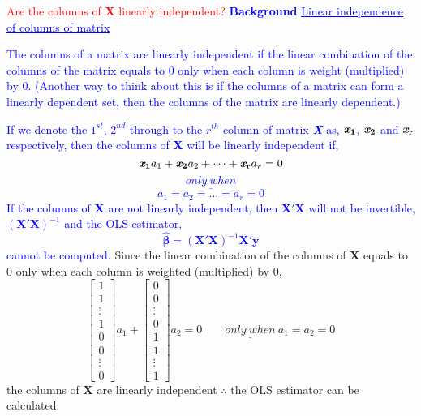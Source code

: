 \documentclass[12pt]{report}
\newenvironment{blueframed}[1][blue]
{\def\FrameCommand{\fboxsep=\FrameSep\fcolorbox{#1}{white}}%
\MakeFramed {\advance\hsize-\width \FrameRestore}}
{\endMakeFramed}
\begin{document}
\newpage
\noindent \textcolor{red}{Are the columns of \textbf{X} linearly independent?}
\justify
\begin{blueframed}
	\textcolor{blue}{\textbf{Background}}
	\vspace{-\baselineskip}
	\justify
	\textcolor{blue}{\underline{Linear independence of columns of matrix}}
	
	\noindent \textcolor{blue}
	{
		The columns of a matrix are linearly independent if the linear combination of the columns of the matrix equals to 0 only when each column is weight (multiplied) by 0. (Another way to think about this is if the columns of a matrix can form a linearly dependent set, then the columns of the matrix are linearly dependent.)
	}
	
	\noindent \textcolor{blue}
	{
		If we denote the $1^{st}$, $2^{nd}$ through to the $r^{th}$ column of matrix \textit{\textbf{X}} as, $\textit{\textbf{x}}_\textbf{1}$, $\textit{\textbf{x}}_\textbf{2}$ and $\textit{\textbf{x}}_\textbf{r}$ respectively, then the columns of \textbf{X} will be linearly independent if,
		$$ 
		\textit{\textbf{x}}_\textbf{1}a_1 + \textit{\textbf{x}}_\textbf{2}a_2 + \dots + \textit{\textbf{x}}_\textbf{r}a_r = 0
		$$
		$$
		\underline{only\ when}
		$$
		$$
		a_1 = a_2 = \dots = a_r = 0
		$$ If the columns of \textbf{X} are not linearly independent, then $\textbf{X}'\textbf{X}$ will not be invertible,
		\sout{$(\textbf{X}'\textbf{X})^{-1}$}
		and the OLS estimator,
		$$
		\widehat{\boldsymbol{\beta}} 
		= (\textbf{X}'\textbf{X})^{-1}\textbf{X}'\textbf{y}
		$$
		cannot be computed.
	}
\end{blueframed}
\noindent Since the linear combination of the columns of \textbf{X} equals to 0 only when each column is weighted (multiplied) by 0,
$$
\begin{bmatrix}
1 \\
1 \\
\vdots \\
1 \\
0 \\
0 \\
\vdots \\
0
\end{bmatrix}
a_1
+
\begin{bmatrix}
0 \\
0 \\
\vdots \\
0 \\
1 \\
1 \\
\vdots \\
1
\end{bmatrix}
a_2
=
0
\qquad
\underline{only\ when}\ a_1 = a_2 = 0
$$
\noindent the columns of \textbf{X} are linearly independent $\therefore$ the OLS estimator can be calculated.
\end{document}
